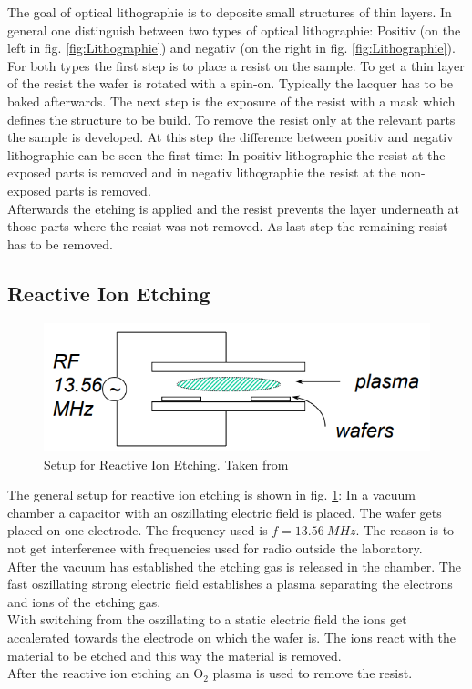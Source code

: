 \documentclass[%
 reprint,
amsmath,amssymb,
pra,
]{revtex4-1}
\begin{document}
The goal of optical lithographie is to deposite small structures of thin layers. In general one distinguish between two types of optical lithographie: Positiv (on the left in fig. \ref{fig:Lithographie}) and negativ (on the right in fig. \ref{fig:Lithographie}). \\
For both types the first step is to place a resist on the sample. To get a thin layer of the resist the wafer is rotated with a spin-on. Typically the lacquer has to be baked afterwards. The next step is the exposure of the resist with a mask which defines the structure to be build. To remove the resist only at the relevant parts the sample is developed. At this step the difference between positiv and negativ lithographie can be seen the first time: In positiv lithographie the resist at the exposed parts is removed and in negativ lithographie the resist at the non-exposed parts is removed. \\
Afterwards the etching is applied and the resist prevents the layer underneath at those parts where the resist was not removed. As last step the remaining resist has to be removed.


\subsection{Reactive Ion Etching}

\begin{figure}
\centering
\includegraphics[scale=0.5]{Bilder/Reactive_Ion_Etching.PNG}
\caption{Setup for Reactive Ion Etching. Taken from \cite{Cheung}}
\label{fig:Reactive_Ion_Etching}
\end{figure}

The general setup for reactive ion etching is shown in fig. \ref{fig:Reactive_Ion_Etching}: In a vacuum chamber a capacitor with an oszillating electric field is placed. The wafer gets placed on one electrode. The frequency used is $f = \SI{13.56}{MHz}$. The reason is to not get interference with frequencies used for radio outside the laboratory. \\
After the vacuum has established the etching gas is released in the chamber. The fast oszillating strong electric field establishes a plasma separating the electrons and ions of the etching gas. \\
With switching from the oszillating to a static electric field the ions get accalerated towards the electrode on which the wafer is. The ions react with the material to be etched and this way the material is removed. \\
After the reactive ion etching an O$_2$ plasma is used to remove the resist.
\end{document}
